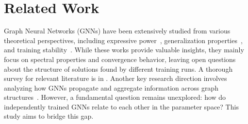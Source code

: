 \section{Related Work}
\label{sec: rw}

    
    
    
    Graph Neural Networks (GNNs) have been extensively studied from various theoretical perspectives, including expressive power~\citep{maron, xupowerful}, generalization properties~\citep{verma2019stability, aminian2024generalization}, and training stability~\citep{oono2019graph}. While these works provide valuable insights, they mainly focus on spectral properties and convergence behavior, leaving open questions about the structure of solutions found by different training runs. A thorough survey for relevant literature is in \citet{jegelka2022theory, huang2024foundations}. Another key research direction involves analyzing how GNNs propagate and aggregate information across graph structures~\citep{loukas2019graph, wu2019simplifying}. %
    However, a fundamental question remains unexplored: how do independently trained GNNs relate to each other in the parameter space? This study aims to bridge this gap.
    
